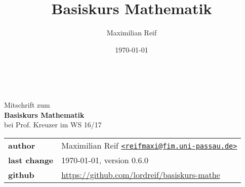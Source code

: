 \documentclass[11pt,a4paper,ngerman]{article}
\date{\today}
\author{Maximilian Reif}
\title{Basiskurs Mathematik}
\begin{document}
\begin{titlepage}
    \ \newline\newline\newline\newline\newline
	\begin{center}
		\huge Mitschrift zum \\
		\Huge \textbf{Basiskurs Mathematik} \\
		\huge bei Prof. Kreuzer im WS 16/17 \\
		\normalsize

		\vspace{1cm}
		\begin{tabular}[b]{l|l}
			\textbf{author} & Maximilian Reif \texttt{\href{mailto:reifmaxi@fim.uni-passau.de}
			{<reifmaxi@fim.uni-passau.de>}} \\
			\textbf{last change} & \today, version 0.6.0 \\
			\textbf{github} & \url{https://github.com/lordreif/basiskurs-mathe}
		\end{tabular}

		\vspace{1cm}
		
	\end{center}
   
	
\end{titlepage}

\setcounter{page}{2}

\newpage
\tableofcontents \thispagestyle{empty}
\newpage







%
%
%
%
\setcounter{section}{10}


\end{document}
